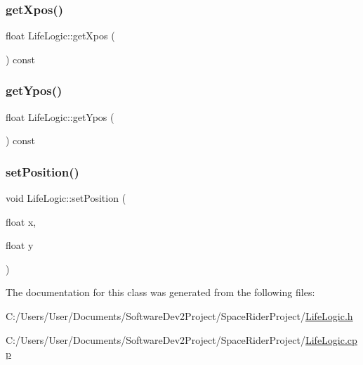 \subsubsection{\texorpdfstring{get\+Xpos()}{getXpos()}}
{\footnotesize\ttfamily float Life\+Logic\+::get\+Xpos (\begin{DoxyParamCaption}{ }\end{DoxyParamCaption}) const}

\mbox{\label{class_life_logic_a7b7591ddd38994fc052a022177690d72}} 
\subsubsection{\texorpdfstring{get\+Ypos()}{getYpos()}}
{\footnotesize\ttfamily float Life\+Logic\+::get\+Ypos (\begin{DoxyParamCaption}{ }\end{DoxyParamCaption}) const}

\mbox{\label{class_life_logic_a6080cbd8a0c6f6767504974999061209}} 
\subsubsection{\texorpdfstring{set\+Position()}{setPosition()}}
{\footnotesize\ttfamily void Life\+Logic\+::set\+Position (\begin{DoxyParamCaption}\item[{float}]{x,  }\item[{float}]{y }\end{DoxyParamCaption})}



The documentation for this class was generated from the following files\+:\begin{DoxyCompactItemize}
\item 
C\+:/\+Users/\+User/\+Documents/\+Software\+Dev2\+Project/\+Space\+Rider\+Project/\hyperlink{_life_logic_8h}{Life\+Logic.\+h}\item 
C\+:/\+Users/\+User/\+Documents/\+Software\+Dev2\+Project/\+Space\+Rider\+Project/\hyperlink{_life_logic_8cpp}{Life\+Logic.\+cpp}\end{DoxyCompactItemize}

